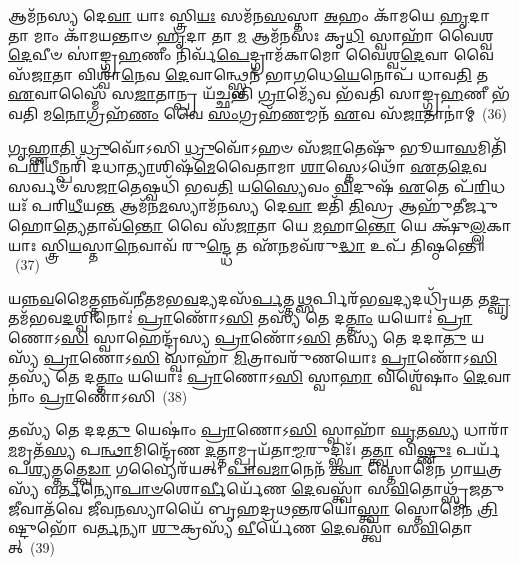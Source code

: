 𑌆𑌮᳴𑌨𑌸𑍍𑌯 𑌦𑍇\-\ul{𑌵𑌾} 𑌯𑌾𑌃 𑌸𑍍𑌤𑍍𑌰𑌿\-\ul{𑌯𑌃} 𑌸𑌮᳴𑌨\-\ul{𑌸}\-𑌸𑍍𑌤𑌾 \ul{𑌅}\-𑌹𑌂 𑌕𑌾᳴𑌮𑌯𑍇 \ul{𑌹𑍃}\-𑌦𑌾 𑌤𑌾 𑌮𑌾𑌂 𑌕𑌾᳴𑌮𑌯𑌨𑍍𑌤𑌾𑍞 \ul{𑌹𑍃}\-𑌦𑌾 𑌤𑌾 \ul{𑌮} 𑌆𑌮᳴𑌨𑌸𑌃 𑌕𑍃\-\ul{𑌧𑌿} 𑌸𑍍𑌵𑌾𑌹𑌾᳴ 𑌵𑍈𑌶𑍍𑌵\-\ul{𑌦𑍇}\-𑌵𑍀𑍞 𑌸𑌾॑𑌙𑍍𑌗𑍍𑌰\-\ul{𑌹}\-𑌣𑍀𑌂 𑌨𑌿𑌰𑍍𑌵᳴\-\ul{𑌪𑍇}\-𑌦𑍍𑌗𑍍𑌰𑌾𑌮᳴𑌕𑌾𑌮𑍋 𑌵𑍈𑌶𑍍𑌵\-\ul{𑌦𑍇}\-𑌵𑌾 𑌵𑍈 𑌸᳴\-\ul{𑌜𑌾}\-𑌤𑌾 𑌵𑌿𑌶𑍍𑌵𑌾᳴\-\ul{𑌨𑍇}\-𑌵 \ul{𑌦𑍇}\-𑌵𑌾𑌨𑍍𑌥𑍍𑌸𑍍𑌵𑍇𑌨᳴ 𑌭𑌾\-\ul{𑌗}\-𑌧𑍇\-\ul{𑌯𑍇}\-𑌨𑍋𑌪᳴ 𑌧𑌾𑌵\-\ul{𑌤𑌿} 𑌤 \ul{𑌏}\-𑌵𑌾𑌸𑍍𑌮𑍈᳴ 𑌸\-\ul{𑌜𑌾}\-𑌤𑌾𑌨𑍍𑌪𑍍𑌰 𑌯᳴𑌚𑍍𑌛𑌨𑍍𑌤𑌿 \ul{𑌗𑍍𑌰𑌾}\-𑌮𑍍𑌯𑍇᳴𑌵 𑌭᳴𑌵𑌤𑌿 𑌸𑌾𑌙𑍍𑌗𑍍𑌰\-\ul{𑌹}\-𑌣𑍀 𑌭᳴𑌵𑌤𑌿 𑌮\-\ul{𑌨𑍋}\-𑌗𑍍𑌰𑌹᳴\-\ul{𑌣𑌂} 𑌵𑍈 \ul{𑌸𑌂}\-𑌗𑍍𑌰𑌹᳴\-\ul{𑌣}\-𑌮𑍍𑌮𑌨᳴ \ul{𑌏}\-𑌵 𑌸᳴\-\ul{𑌜𑌾}\-𑌤𑌾𑌨𑌾॑𑌮𑍍~(36)

\-\ul{𑌗𑍃}\-\-\ul{𑌹𑍍𑌣𑌾}\-\-\ul{𑌤𑌿} \ul{𑌧𑍍𑌰𑍁}\-𑌵𑍋᳴\-𑌽𑌸𑌿 \ul{𑌧𑍍𑌰𑍁}\-𑌵𑍋᳴\-𑌽𑌹𑍞 𑌸᳴\-\ul{𑌜𑌾}\-𑌤𑍇𑌷𑍁᳴ 𑌭𑍂𑌯𑌾\-\ul{𑌸}\-𑌮𑌿𑌤𑌿᳴ 𑌪\-\ul{𑌰𑌿}\-𑌧𑍀𑌨𑍍𑌪𑌰𑌿᳴ 𑌦𑌧𑌾\-\ul{𑌤𑍍𑌯𑌾}\-𑌶𑌿𑌷᳴\-\ul{𑌮𑍇}\-𑌵𑍈𑌤𑌾𑌮𑌾 \ul{𑌶𑌾}\-𑌸𑍍𑌤𑍇\-𑌽𑌥𑍋᳴ \ul{𑌏}\-𑌤\-\ul{𑌦𑍇}\-𑌵 𑌸𑌰𑍍𑌵𑍞᳴ 𑌸\-\ul{𑌜𑌾}\-𑌤𑍇𑌷𑍍𑌵𑌧𑌿᳴ 𑌭𑌵\-\ul{𑌤𑌿} 𑌯\-\ul{𑌸𑍍𑌯𑍈}\-𑌵𑌂 \ul{𑌵𑌿}\-𑌦𑍁𑌷᳴ \ul{𑌏}\-𑌤𑍇 𑌪᳴\-\ul{𑌰𑌿}\-𑌧𑌯𑌃᳴ 𑌪𑌰𑌿\-\ul{𑌧𑍀}\-𑌯\-\ul{𑌨𑍍𑌤} 𑌆𑌮᳴𑌨\-\ul{𑌮}\-𑌸𑍍𑌯𑌾𑌮᳴𑌨𑌸𑍍𑌯 𑌦𑍇\-\ul{𑌵𑌾} 𑌇𑌤𑌿᳴ \ul{𑌤𑌿}\-𑌸𑍍𑌰 𑌆𑌹𑍁᳴𑌤𑍀𑌰𑍍𑌜𑍁𑌹𑍋\-\ul{𑌤𑍍𑌯𑍇}\-𑌤𑌾𑌵᳴\-\ul{𑌨𑍍𑌤𑍋} 𑌵𑍈 𑌸᳴\-\ul{𑌜𑌾}\-𑌤𑌾 𑌯𑍇 \ul{𑌮}\-𑌹𑌾\-\ul{𑌨𑍍𑌤𑍋} 𑌯𑍇 𑌕𑍍𑌷𑍁᳴\-\ul{𑌲𑍍𑌲}\-𑌕𑌾 𑌯𑌾𑌃 𑌸𑍍𑌤𑍍𑌰𑌿\-\ul{𑌯}\-𑌸𑍍𑌤𑌾\-\ul{𑌨𑍇}\-𑌵𑌾𑌵᳴ 𑌰𑍁\-\ul{𑌨𑍍𑌦𑍍𑌧𑍇} 𑌤 𑌏᳴\-\ul{𑌨}\-𑌮𑌵᳴𑌰𑍁\-\ul{𑌦𑍍𑌧𑌾} 𑌉𑌪᳴ 𑌤𑌿𑌷𑍍𑌠𑌨𑍍𑌤𑍇॥~(37)

{\anuvakamend[{𑌸𑍍𑌵𑌾𑌹𑌾𑌮᳴𑌨𑌮𑌸𑌿 𑌸\-\ul{𑌜𑌾}\-𑌤𑌾𑌨𑌾𑍞᳴ 𑌰𑍁\-\ul{𑌨𑍍𑌦𑍍𑌧𑍇} 𑌪𑌞𑍍𑌚᳴ 𑌚}]}%

𑌯𑌨𑍍𑌨\-\ul{𑌵}\-𑌮𑍈𑌤𑍍𑌤𑌨𑍍𑌨𑌵᳴𑌨𑍀𑌤𑌮𑌭\-\ul{𑌵}\-𑌦𑍍𑌯𑌦𑌸᳴\-\ul{𑌰𑍍𑌪}\-𑌤𑍍𑌤\-\ul{𑌥𑍍𑌸}\-𑌰𑍍𑌪𑌿𑌰᳴𑌭\-\ul{𑌵}\-𑌦𑍍𑌯𑌦𑌧𑍍𑌰𑌿᳴𑌯\-\ul{𑌤} 𑌤\-\ul{𑌦𑍍𑌘𑍃}\-𑌤𑌮᳴𑌭𑌵\-\ul{𑌦}\-𑌶𑍍𑌵𑌿𑌨𑍋𑌃॑ \ul{𑌪𑍍𑌰𑌾}\-𑌣𑍋᳴\-𑌽\-\ul{𑌸𑌿} 𑌤𑌸𑍍𑌯᳴ 𑌤𑍇 𑌦\-\ul{𑌤𑍍𑌤𑌾𑌂} 𑌯𑌯𑍋𑌃॑ \ul{𑌪𑍍𑌰𑌾}\-𑌣𑍋\-𑌽\-\ul{𑌸𑌿} 𑌸𑍍𑌵𑌾𑌹𑍇𑌨𑍍𑌦𑍍𑌰᳴𑌸𑍍𑌯 \ul{𑌪𑍍𑌰𑌾}\-𑌣𑍋᳴\-𑌽\-\ul{𑌸𑌿} 𑌤𑌸𑍍𑌯᳴ 𑌤𑍇 𑌦𑌦𑌾\-\ul{𑌤𑍁} 𑌯𑌸𑍍𑌯᳴ \ul{𑌪𑍍𑌰𑌾}\-𑌣𑍋\-𑌽\-\ul{𑌸𑌿} 𑌸𑍍𑌵𑌾𑌹𑌾᳴ \ul{𑌮𑌿}\-𑌤𑍍𑌰𑌾𑌵𑌰𑍁᳴𑌣𑌯𑍋𑌃 \ul{𑌪𑍍𑌰𑌾}\-𑌣𑍋᳴\-𑌽\-\ul{𑌸𑌿} 𑌤𑌸𑍍𑌯᳴ 𑌤𑍇 𑌦\-\ul{𑌤𑍍𑌤𑌾𑌂} 𑌯𑌯𑍋𑌃॑ \ul{𑌪𑍍𑌰𑌾}\-𑌣𑍋\-𑌽\-\ul{𑌸𑌿} 𑌸𑍍𑌵𑌾\-\ul{𑌹𑌾} 𑌵𑌿𑌶𑍍𑌵𑍇᳴𑌷𑌾𑌂 \ul{𑌦𑍇}\-𑌵𑌾𑌨𑌾𑌂॑ \ul{𑌪𑍍𑌰𑌾}\-𑌣𑍋᳴\-𑌽𑌸𑌿~(38)

𑌤𑌸𑍍𑌯᳴ 𑌤𑍇 𑌦𑌦\-\ul{𑌤𑍁} 𑌯𑍇𑌷𑌾𑌂॑ \ul{𑌪𑍍𑌰𑌾}\-𑌣𑍋\-𑌽\-\ul{𑌸𑌿} 𑌸𑍍𑌵𑌾𑌹𑌾᳴ \ul{𑌘𑍃}\-𑌤\-\ul{𑌸𑍍𑌯} 𑌧𑌾𑌰𑌾᳴\-\ul{𑌮}\-𑌮𑍃𑌤᳴\-\ul{𑌸𑍍𑌯} 𑌪\-\ul{𑌨𑍍𑌥𑌾}\-𑌮𑌿𑌨𑍍𑌦𑍍𑌰𑍇᳴𑌣 \ul{𑌦}\-𑌤𑍍𑌤𑌾𑌮𑍍𑌪𑍍𑌰𑌯᳴𑌤𑌾\-\ul{𑌮𑍍𑌮}\-𑌰𑍁𑌦𑍍𑌭𑌿𑌃᳴। 𑌤\-\ul{𑌤𑍍𑌤𑍍𑌵𑌾} 𑌵𑌿\-\ul{𑌷𑍍𑌣𑍁𑌃} 𑌪𑌰𑍍𑌯᳴𑌪\-\ul{𑌶𑍍𑌯}\-𑌤𑍍𑌤𑌤𑍍𑌤𑍍𑌵𑍇\-\ul{𑌡𑌾} 𑌗𑌵𑍍𑌯𑍈𑌰᳴𑌯𑌤𑍍। \ul{𑌪𑌾}\-\-\ul{𑌵}\-\-\ul{𑌮𑌾}\-𑌨𑍇𑌨᳴ \ul{𑌤𑍍𑌵𑌾} 𑌸𑍍𑌤𑍋𑌮𑍇᳴𑌨 𑌗𑌾\-\ul{𑌯}\-𑌤𑍍𑌰𑌸𑍍𑌯᳴ 𑌵\-\ul{𑌰𑍍𑌤}\-𑌨𑍍𑌯𑍋\-\ul{𑌪𑌾}\-\-\ul{𑍞}\-𑌶𑍋\-\ul{𑌰𑍍𑌵𑍀}\-𑌰𑍍𑌯𑍇᳴𑌣 \ul{𑌦𑍇}\-𑌵𑌸𑍍𑌤𑍍𑌵𑌾᳴ 𑌸\-\ul{𑌵𑌿}\-𑌤𑍋𑌥𑍍𑌸𑍃᳴𑌜𑌤𑍁 \ul{𑌜𑍀}\-𑌵𑌾𑌤᳴𑌵𑍇 𑌜𑍀𑌵\-\ul{𑌨}\-𑌸𑍍𑌯𑌾𑌯𑍈᳴ 𑌬𑍃𑌹𑌦𑍍𑌰𑌥\-\ul{𑌨𑍍𑌤}\-𑌰𑌯𑍋॑\-\ul{𑌸𑍍𑌤𑍍𑌵𑌾} 𑌸𑍍𑌤𑍋𑌮𑍇᳴𑌨 \ul{𑌤𑍍𑌰𑌿}\-𑌷𑍍𑌟𑍁𑌭𑍋᳴ 𑌵\-\ul{𑌰𑍍𑌤}\-𑌨𑍍𑌯𑌾 \ul{𑌶𑍁}\-𑌕𑍍𑌰𑌸𑍍𑌯᳴ \ul{𑌵𑍀}\-𑌰𑍍𑌯𑍇᳴𑌣 \ul{𑌦𑍇}\-𑌵𑌸𑍍𑌤𑍍𑌵𑌾᳴ 𑌸\-\ul{𑌵𑌿}\-𑌤𑍋𑌤𑍍~(39)

